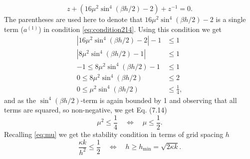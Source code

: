 \documentclass{article}
\begin{document}
\begin{equation}
    z+(16\mu^2\sin^4(\beta h/2) - 2) + z^{-1} = 0.
\end{equation}
The parentheses are used here to denote that $16\mu^2\sin^4(\beta h/2) - 2$ is a single term ($a^{(1)}$) in condition \eqref{eq:condition214}. Using this condition we get
\begin{equation}\nonumber
    \begin{aligned}
        |16\mu^2\sin^4(\beta h/2) - 2|-1&\leq 1\\
        |8\mu^2\sin^4(\beta h/2) - 1|&\leq 1\\
        -1\leq8\mu^2\sin^4(\beta h/2) - 1&\leq 1\\
        0\leq8\mu^2\sin^4(\beta h/2)&\leq 2\\
        0\leq\mu^2\sin^4(\beta h/2)&\leq \frac{1}{4},
    \end{aligned}
\end{equation}
and as the $\sin^4(\beta h/2)$-term is again bounded by 1 and observing that all terms are squared, so non-negative, we get Eq. (7.14)
\begin{equation}
    \mu^2 \leq \frac{1}{4}\quad \Longleftrightarrow\quad \mu \leq \frac{1}{2}.
\end{equation}
Recalling \eqref{eq:mu} we get the stability condition in terms of grid spacing $h$ 
    \begin{equation}
    \frac{\kappa k}{h^2}\leq \frac{1}{2}\quad \Longleftrightarrow\quad h \geq h_\text{min} = \sqrt{2\kappa k}.
\end{equation}
\end{document}
